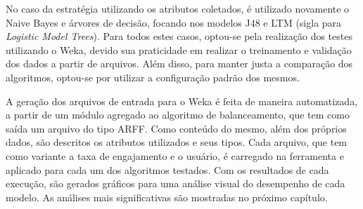 \documentclass[oneside,openright,12pt]{ufsm_2015} %
\begin{document}
    \par No caso da estratégia utilizando os atributos coletados, é utilizado novamente o Naive Bayes e árvores de decisão, focando nos modelos J48 e LTM (sigla para \textit{Logistic Model Trees}). Para todos estes casos, optou-se pela realização dos testes utilizando o Weka, devido sua praticidade em realizar o treinamento e validação dos dados a partir de arquivos. Além disso, para manter justa a comparação dos algoritmos, optou-se por utilizar a configuração padrão dos mesmos.
    
    \par A geração dos arquivos de entrada para o Weka é feita de maneira automatizada, a partir de um módulo agregado ao algoritmo de balanceamento, que tem como saída um arquivo do tipo ARFF. Como conteúdo do mesmo, além dos próprios dados, são descritos os atributos utilizados e seus tipos. Cada arquivo, que tem como variante a taxa de engajamento e o usuário, é carregado na ferramenta e aplicado para cada um dos algoritmos testados. Com os resultados de cada execução, são gerados gráficos para uma análise visual do desempenho de cada modelo. As análises mais significativas são mostradas no próximo capítulo.


\end{document}
